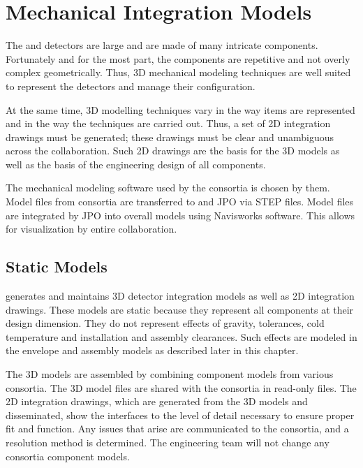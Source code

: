 \section{Mechanical Integration Models}
\label{sec:fdsp-coord-integ-models}

The  and  detectors are large and are made of many
intricate components. Fortunately and for the most part, the
components are repetitive and not overly complex
geometrically. Thus, 3D mechanical modeling techniques are well suited
to represent the detectors and manage their configuration.

At the same time, 3D modelling techniques vary in the way items are
represented and in the way the techniques are carried out. Thus, a set
of 2D integration drawings must be generated; these drawings must be
clear and unambiguous across the collaboration. Such 2D drawings are
the basis for the 3D models as well as the basis of the engineering
design of all components.

The mechanical modeling software used  by the consortia is chosen by them. Model files from consortia are transferred to  and JPO via STEP files. Model files are integrated by JPO into overall models using Navisworks software. This allows for visualization by entire collaboration. 

\subsection{Static Models}
\label{sec:fdsp-coord-integ-static}

 generates and maintains 3D detector
integration models as well as 2D integration drawings. These models
are static because they represent all components at their design
dimension. They do not represent effects of gravity, tolerances, cold
temperature and installation and assembly clearances. Such effects are modeled in the envelope and assembly models as described later in this chapter.


The 3D models are assembled by combining component models from various
consortia. The 3D model files are shared with the consortia in
read-only files. The 2D integration drawings, which are generated from
the 3D models and disseminated, show the interfaces to the level of
detail necessary to ensure proper fit and function. Any issues that
arise are communicated to the consortia, and a resolution method is
determined. The  engineering team will not
change any consortia component models.


